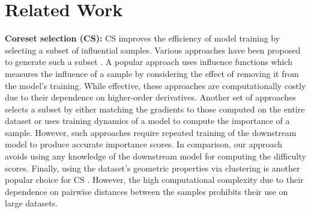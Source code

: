 \section{Related Work}
\label{sec:related-work}
{\bf Coreset selection (CS):} 
CS improves the efficiency of model training by selecting a subset of influential samples. %
Various approaches have been proposed to generate such a subset \cite{guo2022deepcore}. 
A popular approach uses influence functions \cite{koh2017understanding,chatterjee1986influential, liu2021influence,schioppa2022scaling} which measures the influence of a sample by considering the effect of removing it from the model's training.
While effective, these approaches are computationally costly due to their dependence on higher-order derivatives. 
Another set of approaches selects a subset by either matching the gradients to those computed on the entire dataset \cite{mirzasoleiman2020coresets, killamsetty2021grad} or uses training dynamics of a model \cite{toneva2018empirical, pleiss2020identifying,lewis1994heterogeneous,culotta2005reducing,paul2021deep} to compute the importance of a sample. 
However, such approaches require repeated training of the downstream model to produce accurate importance scores.
In comparison, our approach avoids using any knowledge of the downstream model for computing the difficulty scores.
Finally, using the dataset's geometric properties via clustering is another popular choice for CS \cite{sener2017active,sorscher2022beyond,feldman2020turning,feldman2011unified, huang2019coresets}. 
However, the high computational complexity due to their dependence on pairwise distances between the samples prohibits their use on large datasets. 


